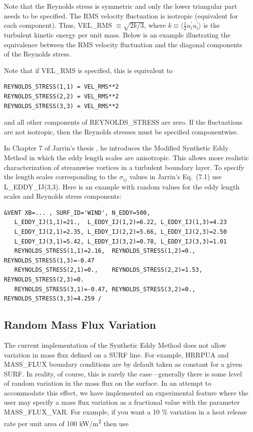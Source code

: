 \documentclass[11pt]{book}
\begin{document}
Note that the Reynolds stress is symmetric and only the lower triangular part needs to be specified.  The RMS velocity fluctuation is isotropic (equivalent for each component). Thus, {\ct VEL\_RMS} $\equiv \sqrt{2k/3}$, where $k\equiv \langle\frac{1}{2}u_i^\prime u_i^\prime\rangle$ is the turbulent kinetic energy per unit mass. Below is an example illustrating the equivalence between the RMS velocity fluctuation and the diagonal components of the Reynolds stress.

\noindent Note that if {\ct VEL\_RMS} is specified, this is equivalent to

\begin{lstlisting}
REYNOLDS_STRESS(1,1) = VEL_RMS**2
REYNOLDS_STRESS(2,2) = VEL_RMS**2
REYNOLDS_STRESS(3,3) = VEL_RMS**2
\end{lstlisting}

\noindent and all other components of {\ct REYNOLDS\_STRESS} are zero. If the fluctuations are not isotropic, then the Reynolds stresses must be specified componentwise.

In Chapter 7 of Jarrin's thesis \cite{Jarrin:2008}, he introduces the Modified Synthetic Eddy Method in which the eddy length scales are anisotropic. This allows more realistic characterization of streamwise vortices in a turbulent boundary layer. To specify the length scales corresponding to the $\sigma_{ij}$ values in Jarrin's Eq.~(7.1) use {\ct L\_EDDY\_IJ(3,3)}.  Here is an example with random values for the eddy length scales and Reynolds stress components:

\begin{lstlisting}
&VENT XB=... , SURF_ID='WIND', N_EDDY=500,
   L_EDDY_IJ(1,1)=21.,  L_EDDY_IJ(1,2)=6.22, L_EDDY_IJ(1,3)=4.23
   L_EDDY_IJ(2,1)=2.35, L_EDDY_IJ(2,2)=5.66, L_EDDY_IJ(2,3)=2.50
   L_EDDY_IJ(3,1)=5.42, L_EDDY_IJ(3,2)=0.78, L_EDDY_IJ(3,3)=1.01
   REYNOLDS_STRESS(1,1)=2.16,  REYNOLDS_STRESS(1,2)=0.,   REYNOLDS_STRESS(1,3)=-0.47
   REYNOLDS_STRESS(2,1)=0.,    REYNOLDS_STRESS(2,2)=1.53, REYNOLDS_STRESS(2,3)=0.
   REYNOLDS_STRESS(3,1)=-0.47, REYNOLDS_STRESS(3,2)=0.,   REYNOLDS_STRESS(3,3)=4.259 /
\end{lstlisting}


\subsection{Random Mass Flux Variation}
\label{info:MASS_FLUX_VAR}

The current implementation of the Synthetic Eddy Method does not allow variation in mass flux defined on a {\ct SURF} line.  For example, {\ct HRRPUA} and {\ct MASS\_FLUX} boundary conditions are by default taken as constant for a given {\ct SURF}.  In reality, of course, this is rarely the case---generally there is some level of random variation in the mass flux on the surface.  In an attempt to accommodate this effect, we have implemented an experimental feature where the user may specify a mass flux variation as a fractional value with the parameter {\ct MASS\_FLUX\_VAR}.  For example, if you want a 10 \% variation in a heat release rate per unit area of 100 \si{kW/m^2} then use
\end{document}
